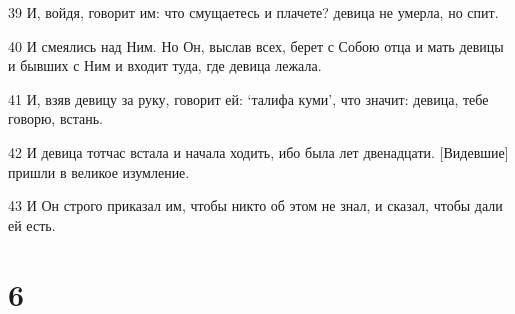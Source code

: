 \par 39 И, войдя, говорит им: что смущаетесь и плачете? девица не умерла, но спит.
\par 40 И смеялись над Ним. Но Он, выслав всех, берет с Собою отца и мать девицы и бывших с Ним и входит туда, где девица лежала.
\par 41 И, взяв девицу за руку, говорит ей: `талифа куми', что значит: девица, тебе говорю, встань.
\par 42 И девица тотчас встала и начала ходить, ибо была лет двенадцати. [Видевшие] пришли в великое изумление.
\par 43 И Он строго приказал им, чтобы никто об этом не знал, и сказал, чтобы дали ей есть.

\chapter{6}

